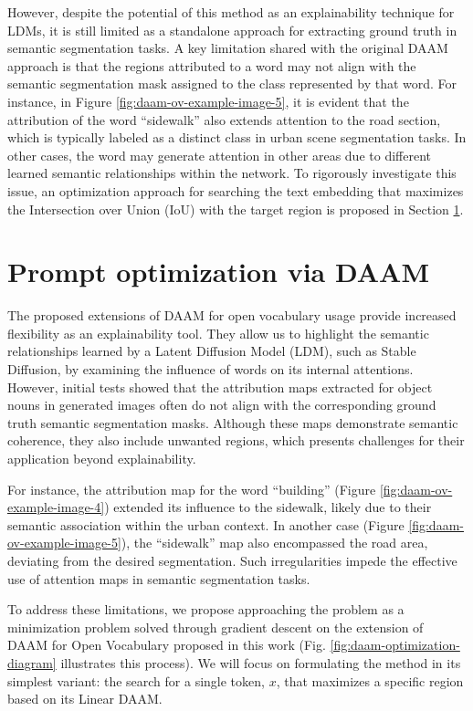 However, despite the potential of this method as an explainability technique for LDMs, it is still limited as a standalone approach for extracting ground truth in semantic segmentation tasks. A key limitation shared with the original DAAM approach \cite{DAAM} is that the regions attributed to a word may not align with the semantic segmentation mask assigned to the class represented by that word. For instance, in Figure \ref{fig:daam-ov-example-image-5}, it is evident that the attribution of the word ``sidewalk'' also extends attention to the road section, which is typically labeled as a distinct class in urban scene segmentation tasks. In other cases, the word may generate attention in other areas due to different learned semantic relationships within the network. To rigorously investigate this issue, an optimization approach for searching the text embedding that maximizes the Intersection over Union (IoU) with the target region is proposed in Section \ref{cha:methodology-ov-daam-optimization}.


\section{Prompt optimization via DAAM}
\label{cha:methodology-ov-daam-optimization}


The proposed extensions of DAAM for open vocabulary usage provide increased flexibility as an explainability tool. They allow us to highlight the semantic relationships learned by a Latent Diffusion Model (LDM), such as Stable Diffusion, by examining the influence of words on its internal attentions. However, initial tests showed that the attribution maps extracted for object nouns in generated images often do not align with the corresponding ground truth semantic segmentation masks. Although these maps demonstrate semantic coherence, they also include unwanted regions, which presents challenges for their application beyond explainability.

For instance, the attribution map for the word ``building'' (Figure \ref{fig:daam-ov-example-image-4}) extended its influence to the sidewalk, likely due to their semantic association within the urban context. In another case (Figure \ref{fig:daam-ov-example-image-5}), the ``sidewalk'' map also encompassed the road area, deviating from the desired segmentation. Such irregularities impede the effective use of attention maps in semantic segmentation tasks.

To address these limitations, we propose approaching the problem as a minimization problem solved through gradient descent on the extension of DAAM for Open Vocabulary proposed in this work (Fig. \ref{fig:daam-optimization-diagram} illustrates this process). We will focus on formulating the method in its simplest variant: the search for a single token, $x$, that maximizes a specific region based on its Linear DAAM.


